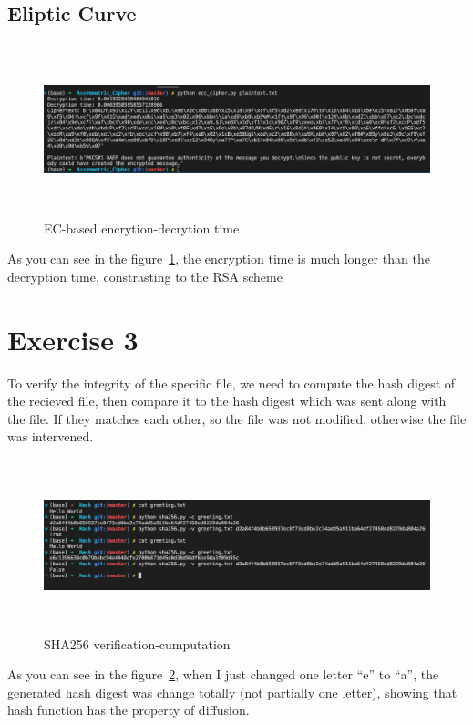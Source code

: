 \documentclass{article}
\begin{document}
\subsection*{Eliptic Curve}
%
\begin{figure}[hpt]
    \centering
    \includegraphics[width=140mm, height=50mm]{ec.png}
    \caption{EC-based encrytion-decrytion time}
    \label{fig:ec}
\end{figure}

As you can see in the figure~\ref{fig:ec}, the encryption time is much longer than 
the decryption time, constrasting to the RSA scheme

\section*{Exercise 3}
%
To verify the integrity of the specific file, we need to compute the hash digest of the
recieved file, then compare it to the hash digest which was sent along with the file.
If they matches each other, so the file was not modified, otherwise the file was intervened.

\begin{figure}
    \centering
    \includegraphics[width=140mm, height=50mm]{sha256.png}
    \caption{SHA256 verification-cumputation}
    \label{fig:sha256}
\end{figure}

As you can see in the figure~\ref{fig:sha256}, when I just changed one letter ``e'' to ``a'', the
generated hash digest was change totally (not partially one letter), showing that hash function
has the property of diffusion.
\end{document}
